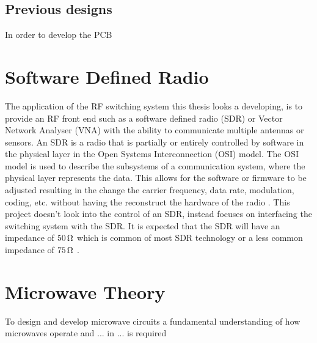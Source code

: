 \documentclass[12pt,openany,a4paper]{book}
\newcommand{\ohm}	{\ensuremath{\rm\,\Omega}}
\begin{document}
\subsection{Previous designs}
In order to develop the PCB 




\section{Software Defined Radio}
The application of the RF switching system this thesis looks a developing, is to provide an RF front end such as a software defined radio (SDR) or Vector Network Analyser (VNA) with the ability to communicate multiple antennas or sensors. An SDR is a radio that is partially or entirely controlled by software in the physical layer in the Open Systems Interconnection (OSI) model. The OSI model is used to describe the subsystems of a communication system, where the physical layer represents the data. This allows for the software or firmware to be adjusted resulting in the change the carrier frequency, data rate, modulation, coding, etc. without having the reconstruct the hardware of the radio \cite{ref6}. This project doesn't look into the control of an SDR, instead focuses on interfacing the switching system with the SDR. It is expected that the SDR will have an impedance of $50\ohm$ which is common of most SDR technology or a less common impedance of $75\ohm$ \cite{ref7}.


\section{Microwave Theory}
To design and develop microwave circuits a fundamental understanding of how microwaves operate and ... in ... is required
\end{document}
